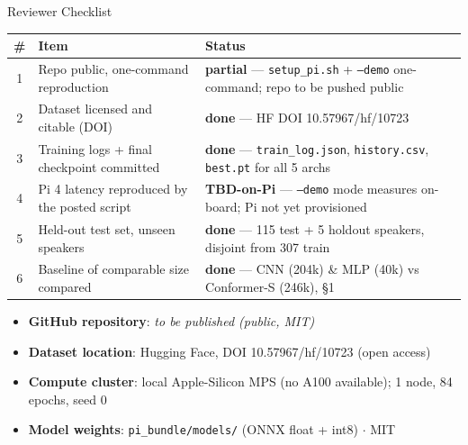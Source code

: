 \documentclass[aspectratio=169,10pt]{beamer}
\newcommand{\OK}{\textcolor{okgreen}{\textbf{done}}}
\newcommand{\PART}{\textcolor{warnamber}{\textbf{partial}}}
\newcommand{\TBD}{\textcolor{tbdgray}{\textbf{TBD-on-Pi}}}
\begin{document}
\begin{frame}{Reviewer Checklist}
\small
\begin{table}
\centering
\begin{tabular}{@{}clp{7.6cm}@{}}
\toprule
\textbf{\#} & \textbf{Item} & \textbf{Status} \\
\midrule
1 & Repo public, one-command reproduction & \PART{} --- \texttt{setup\_pi.sh} + \texttt{--demo} one-command; repo to be pushed public \\
2 & Dataset licensed and citable (DOI) & \OK{} --- HF DOI 10.57967/hf/10723 \\
3 & Training logs + final checkpoint committed & \OK{} --- \texttt{train\_log.json}, \texttt{history.csv}, \texttt{best.pt} for all 5 archs \\
4 & Pi 4 latency reproduced by the posted script & \TBD{} --- \texttt{--demo} mode measures on-board; Pi not yet provisioned \\
5 & Held-out test set, unseen speakers & \OK{} --- 115 test + 5 holdout speakers, disjoint from 307 train \\
6 & Baseline of comparable size compared & \OK{} --- CNN (204k) \& MLP (40k) vs Conformer-S (246k), \S1 \\
\bottomrule
\end{tabular}
\end{table}

\vspace{0.5em}
\begin{itemize}\small
\item \textbf{GitHub repository}: \emph{to be published (public, MIT)}
\item \textbf{Dataset location}: Hugging Face, DOI 10.57967/hf/10723 (open access)
\item \textbf{Compute cluster}: local Apple-Silicon MPS (no A100 available); 1 node, 84 epochs, seed 0
\item \textbf{Model weights}: \texttt{pi\_bundle/models/} (ONNX float + int8) $\cdot$ MIT
\end{itemize}
\end{frame}
\end{document}
